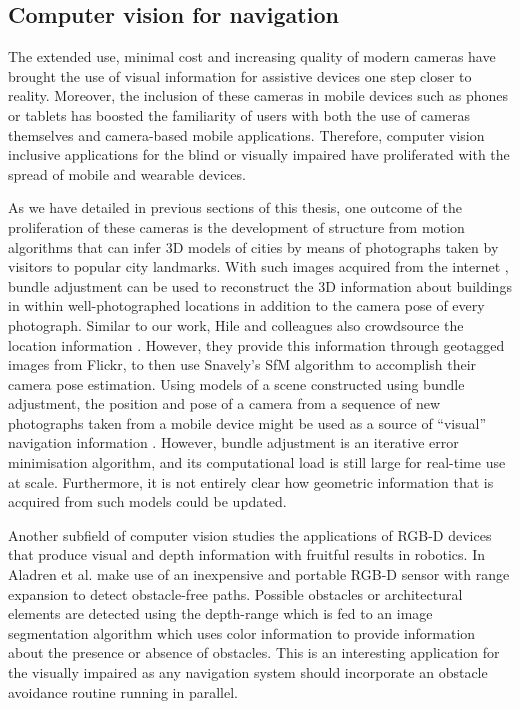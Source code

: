 \subsection{Computer vision for navigation}

The extended use, minimal cost and increasing quality of modern cameras have brought the use of visual information for assistive devices one step closer to reality. Moreover, the inclusion of these cameras in mobile devices such as phones or tablets has boosted the familiarity of users with both the use of cameras themselves and camera-based mobile applications. Therefore, computer vision inclusive applications for the blind or visually impaired have proliferated with the spread of mobile and wearable devices. 

As we have detailed in previous sections of this thesis, one outcome of the proliferation of these cameras is the development of structure from motion algorithms that can infer 3D models of cities \citep{agarwal2011building} by means of photographs taken by visitors to popular city landmarks. With such images acquired from the internet \citep{snavely2006photo}, bundle adjustment can be used to reconstruct the 3D information about buildings in within well-photographed locations in addition to the camera pose of every photograph. Similar to our work, Hile and colleagues also crowdsource the location information  \cite{hile2010visual}. However, they provide this information through geotagged images from Flickr, to then use Snavely's SfM algorithm \citep{snavely2006photo} to accomplish their camera pose estimation. Using models of a scene constructed using bundle adjustment, the position and pose of a camera from a sequence of new photographs taken from a mobile device might be used as a source of ``visual'' navigation information \citep{ventura2014global}.  However, bundle adjustment is an iterative error minimisation algorithm, and its computational load is still large for real-time use at scale.  Furthermore, it is not entirely clear how geometric information that is acquired from such models could be updated.

Another subfield of computer vision studies the applications of RGB-D devices that produce visual and depth information with fruitful results in robotics. In \cite{aladren2014navigation} Aladren et al. make use of an inexpensive and portable RGB-D sensor with range expansion to detect obstacle-free paths. Possible obstacles or architectural elements are detected using the depth-range which is fed to an image segmentation algorithm which uses color information to provide information about the presence or absence of obstacles. This is an interesting application for the visually impaired as any navigation system should incorporate an obstacle avoidance routine running in parallel.

